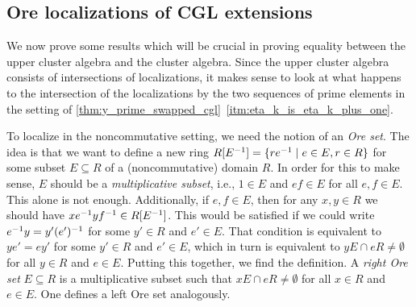 \subsection{Ore localizations of CGL extensions}

We now prove some results which will be crucial in proving equality between the upper
cluster algebra and the cluster algebra. Since the upper cluster algebra consists of
intersections of localizations, it makes sense to look at what happens to the
intersection of the localizations by the two sequences of prime elements in the setting
of \cref{thm:y_prime_swapped_cgl}~\ref*{itm:eta_k_is_eta_k_plus_one}.

To localize in the noncommutative setting, we need the notion of an \emph{Ore
	set}. The idea is that we want to define a new ring $R[E^{-1}] = \{re^{-1}
	\mid e \in E, r\in R\}$ for some subset $E \subseteq R$ of a (noncommutative) domain
$R$. In order for this to make sense, $E$ should be a \emph{multiplicative
	subset}, i.e., $1 \in E$ and $ef \in E$ for all $e,f \in
	E$. This alone is not enough. Additionally, if $e, f \in E$, then for any $x, y \in R$
we should have $xe^{-1} yf^{-1} \in R[E^{-1}]$. This would be satisfied if we could write
$e^{-1} y = y' (e')^{-1}$ for some $y' \in R$ and $e' \in E$. That condition is
equivalent to $y e' = e y'$ for some $y' \in R$ and $e' \in E$, which in turn is
equivalent to $y E \cap e R \neq \emptyset$ for all $y \in R$ and $e \in E$. Putting
this together, we find the definition. A \emph{right Ore set} $E \subseteq R$ is a
multiplicative subset such that $x E \cap e R \neq \emptyset$ for all $x \in R$ and $e
	\in E$. One defines a left Ore set analogously.

